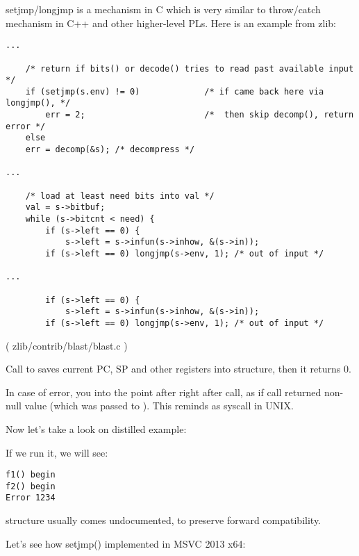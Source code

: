 

setjmp/longjmp is a mechanism in C which is very similar to throw/catch mechanism in C++ and other higher-level \ac{PL}s.
Here is an example from zlib:

\begin{lstlisting}[style=customc]
...

    /* return if bits() or decode() tries to read past available input */
    if (setjmp(s.env) != 0)             /* if came back here via longjmp(), */
        err = 2;                        /*  then skip decomp(), return error */
    else
	err = decomp(&s); /* decompress */

...

    /* load at least need bits into val */
    val = s->bitbuf;
    while (s->bitcnt < need) {
        if (s->left == 0) {
            s->left = s->infun(s->inhow, &(s->in));
	    if (s->left == 0) longjmp(s->env, 1); /* out of input */

...

        if (s->left == 0) {
            s->left = s->infun(s->inhow, &(s->in));
	    if (s->left == 0) longjmp(s->env, 1); /* out of input */
\end{lstlisting}
( zlib/contrib/blast/blast.c )

Call to  saves current \ac{PC}, \ac{SP} and other registers into  structure, then it returns 0.

In case of error,   you into the point after right after  call,
as if  call returned non-null value (which was passed to ).
This reminds as  syscall in UNIX.

Now let's take a look on distilled example:



If we run it, we will see:

\begin{lstlisting}
f1() begin
f2() begin
Error 1234
\end{lstlisting}

 structure usually comes undocumented, to preserve forward compatibility.

Let's see how setjmp() implemented in MSVC 2013 x64:



